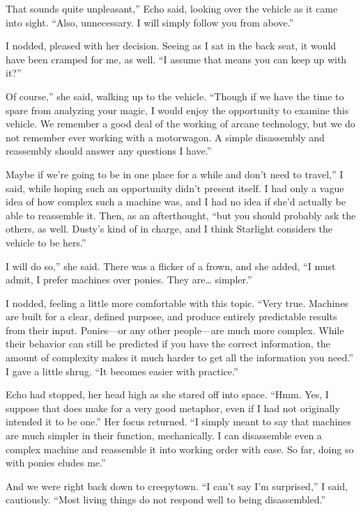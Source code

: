 \leavevmode{}That sounds quite unpleasant,” Echo said, looking over the vehicle as it came into sight. “Also, unnecessary. I will simply follow you from above.”

I nodded, pleased with her decision. Seeing as I sat in the back seat, it would have been cramped for me, as well. “I assume that means you can keep up with it?”

\leavevmode{}Of course,” she said, walking up to the vehicle. “Though if we have the time to spare from analyzing your magic, I would enjoy the opportunity to examine this vehicle. We remember a good deal of the working of arcane technology, but we do not remember ever working with a motorwagon. A simple disassembly and reassembly should answer any questions I have.”

\leavevmode{}Maybe if we’re going to be in one place for a while and don’t need to travel,” I said, while hoping such an opportunity didn’t present itself. I had only a vague idea of how complex such a machine was, and I had no idea if she’d actually be able to reassemble it. Then, as an afterthought, “but you should probably ask the others, as well. Dusty’s kind of in charge, and I think Starlight considers the vehicle to be hers.”

\leavevmode{}I will do so,” she said. There was a flicker of a frown, and she added, “I must admit, I prefer machines over ponies. They are… simpler.”

I nodded, feeling a little more comfortable with this topic. “Very true. Machines are built for a clear, defined purpose, and produce entirely predictable results from their input. Ponies—or any other people—are much more complex. While their behavior can still be predicted if you have the correct information, the amount of complexity makes it much harder to get all the information you need.” I gave a little shrug. “It becomes easier with practice.”

Echo had stopped, her head high as she stared off into space. “Hmm. Yes, I suppose that does make for a very good metaphor, even if I had not originally intended it to be one.” Her focus returned. “I simply meant to say that machines are much simpler in their function, mechanically. I can disassemble even a complex machine and reassemble it into working order with ease. So far, doing so with ponies eludes me.”

And we were right back down to creepytown. “I can’t say I’m surprised,” I said, cautiously. “Most living things do not respond well to being disassembled.”

